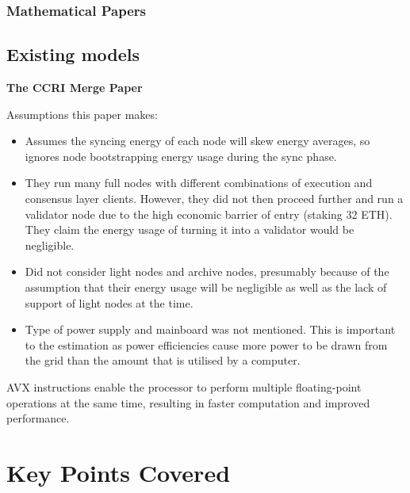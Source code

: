 
\subsubsection{Mathematical Papers}



\subsection{ Existing models }
\label{LitRevExistingModels}
\textbf{The CCRI Merge Paper } \cite{CryptoCarbonRatingsInstitute2022TheNetwork}

Assumptions this paper makes:
\begin{itemize}
    \item Assumes the syncing energy of each node will skew energy averages, so ignores node bootstrapping energy usage during the sync phase.
    
    \item They run many full nodes with different combinations of execution and consensus layer clients. However, they did not then proceed further and run a validator node due to the high economic barrier of entry (staking 32 ETH). They claim the energy usage of turning it into a validator would be negligible.
    
    \item Did not consider light nodes and archive nodes, presumably because of the assumption that their energy usage will be negligible as well as the lack of support of light nodes at the time.

    \item Type of power supply and mainboard was not mentioned. This is important to the estimation as power efficiencies cause more power to be drawn from the grid than the amount that is utilised by a computer.
\end{itemize}



AVX instructions enable the processor to perform multiple floating-point operations at the same time, resulting in faster computation and improved performance. \cite{Schuchart2016TheScale}



\section{Key Points Covered}
